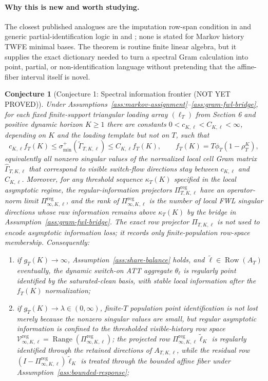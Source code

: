 \documentclass[11pt]{article}
\theoremstyle{definition}
\theoremstyle{plain}
\newtheorem{conjecture}{Conjecture}
\theoremstyle{remark}
\begin{document}
\paragraph{Why this is new and worth studying.}
The closest published analogues are the imputation row-span condition in \citet{borusyak2024eventstudy} and generic partial-identification logic in \citet{manski2003partial} and \citet{tamer2010partial}; none is stated for Markov history TWFE minimal bases.
The theorem is routine finite linear algebra, but it supplies the exact dictionary needed to turn a spectral Gram calculation into point, partial, or non-identification language without pretending that the affine-fiber interval itself is novel.

\begin{conjecture}[Conjecture 1: Spectral information frontier (NOT YET PROVED)]\label{conj:spectral-frontier}
Under Assumptions~\ref{ass:markov-assignment}--\ref{ass:gram-fwl-bridge}, for each fixed finite-support triangular loading array \((\ell_T)\) from Section 6 and positive dynamic horizon \(K\ge1\) there are constants \(0<c_{K,\ell}<C_{K,\ell}<\infty\), depending on \(K\) and the loading template but not on \(T\), such that
\[
c_{K,\ell} f_T(K)\le \sigma_{\min}^+(\widetilde \Gamma_{T,K,\ell})\le C_{K,\ell} f_T(K),
\qquad f_T(K)=T\phi_T(1-\rho_T^K),
\]
equivalently all nonzero singular values of the normalized local cell Gram matrix \(\widehat \Gamma_{T,K,\ell}\) that correspond to visible switch-flow directions stay between \(c_{K,\ell}\) and \(C_{K,\ell}\).
Moreover, for any threshold sequence \(\kappa_T(K)\) specified in the local asymptotic regime, the regular-information projectors \(\Pi^{\mathrm{reg}}_{T,K,\ell}\) have an operator-norm limit \(\Pi^{\mathrm{reg}}_{\infty,K,\ell}\), and the rank of \(\Pi^{\mathrm{reg}}_{\infty,K,\ell}\) is the number of local FWL singular directions whose raw information remains above \(\kappa_T(K)\) by the bridge in Assumption~\ref{ass:gram-fwl-bridge}.
The exact row projector \(\Pi_{T,K,\ell}\) is not used to encode asymptotic information loss; it records only finite-population row-space membership.
Consequently:
\begin{enumerate}[label=(\roman*)]
\item if \(g_T(K)\to\infty\), Assumption~\ref{ass:share-balance} holds, and \(\widetilde\ell\in\operatorname{Row}(A_T)\) eventually, the dynamic switch-on ATT aggregate \(\theta_\ell\) is regularly point identified by the saturated-clean basis, with stable local information after the \(f_T(K)\) normalization;
\item if \(g_T(K)\to\lambda\in(0,\infty)\), finite-\(T\) population point identification is not lost merely because the nonzero singular values are small, but regular asymptotic information is confined to the thresholded visible-history row space \(\mathcal V^{\mathrm{reg}}_{\infty,K,\ell}=\operatorname{Range}(\Pi^{\mathrm{reg}}_{\infty,K,\ell})\); the projected row \(\Pi^{\mathrm{reg}}_{\infty,K,\ell}\widetilde\ell_K\) is regularly identified through the retained directions of \(A_{T,K,\ell}\), while the residual row \((I-\Pi^{\mathrm{reg}}_{\infty,K,\ell})\widetilde\ell_K\) is treated through the bounded affine fiber under Assumption~\ref{ass:bounded-response};

\end{enumerate}
\end{conjecture}
\end{document}
